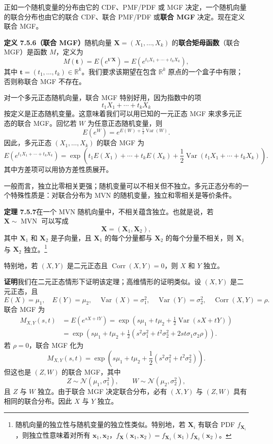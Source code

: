 \documentclass[UTF8,12pt,a4paper,fontset=fandol]{ctexart}
\begin{document}
正如一个随机变量的分布由它的 CDF、PMF/PDF 或 MGF 决定，一个随机向量的联合分布也由它的联合 CDF、联合 PMF/PDF 或\textbf{联合 MGF} 决定。现在定义联合 MGF。

\noindent\textbf{定义 7.5.6（联合 MGF）}\quad 随机向量 $\mathbf{X}=(X_1,\ldots,X_k)$ 的\textbf{联合矩母函数}（联合 MGF）是函数 $M$，定义为
\[
  M(\mathbf{t})=E(e^{\mathbf{t}'\mathbf{X}})
  =E\left(e^{t_1X_1+\cdots+t_kX_k}\right),
\]
其中 $\mathbf{t}=(t_1,\ldots,t_k)\in \mathbb{R}^k$。我们要求该期望在包含 $\mathbb{R}^k$ 原点的一个盒子中有限；否则称联合 MGF 不存在。

对一个多元正态随机向量，联合 MGF 特别好用，因为指数中的项
\[
  t_1X_1+\cdots+t_kX_k
\]
按定义是正态随机变量。这意味着我们可以用已知的一元正态 MGF 来求多元正态的联合 MGF。回忆若 $W$ 为任意正态随机变量，则
\[
  E(e^W)=e^{E(W)+\frac12\operatorname{Var}(W)}.
\]
因此，多元正态 $(X_1,\ldots,X_k)$ 的联合 MGF 为
\[
  E\left(e^{t_1X_1+\cdots+t_kX_k}\right)
  =\exp\left(t_1E(X_1)+\cdots+t_kE(X_k)
  +\frac12\operatorname{Var}(t_1X_1+\cdots+t_kX_k)\right).
\]
其中方差项可以用协方差性质展开。

一般而言，独立比零相关更强；随机变量可以不相关但不独立。多元正态分布的一个特殊性质是：对联合分布为 MVN 的随机变量，独立和零相关是等价条件。

\noindent\textbf{定理 7.5.7}\quad 在一个 MVN 随机向量中，不相关蕴含独立。也就是说，若 $\mathbf{X}\sim \operatorname{MVN}$ 可以写成
\[
  \mathbf{X}=(\mathbf{X}_1,\mathbf{X}_2),
\]
其中 $\mathbf{X}_1$ 和 $\mathbf{X}_2$ 是子向量，且 $\mathbf{X}_1$ 的每个分量都与 $\mathbf{X}_2$ 的每个分量不相关，则 $\mathbf{X}_1$ 与 $\mathbf{X}_2$ 独立。\footnote{随机向量的独立性与随机变量的独立性类似。特别地，若 $\mathbf{X}_i$ 有联合 PDF $f_{\mathbf{X}_i}$，则独立性意味着对所有 $\mathbf{x}_1,\mathbf{x}_2$，$f_{\mathbf{X}}(\mathbf{x}_1,\mathbf{x}_2)=f_{\mathbf{X}_1}(\mathbf{x}_1)f_{\mathbf{X}_2}(\mathbf{x}_2)$。}

特别地，若 $(X,Y)$ 是二元正态且 $\operatorname{Corr}(X,Y)=0$，则 $X$ 和 $Y$ 独立。

\noindent\textbf{证明}\quad 我们在二元正态情形下证明该定理；高维情形的证明类似。设 $(X,Y)$ 是二元正态，且
\[
  E(X)=\mu_1,\quad E(Y)=\mu_2,\quad
  \operatorname{Var}(X)=\sigma_1^2,\quad
  \operatorname{Var}(Y)=\sigma_2^2,\quad
  \operatorname{Corr}(X,Y)=\rho.
\]
联合 MGF 为
\[
\begin{aligned}
  M_{X,Y}(s,t)
  &=E(e^{sX+tY})
  =\exp\left(s\mu_1+t\mu_2+\frac12\operatorname{Var}(sX+tY)\right)\\
  &=\exp\left(s\mu_1+t\mu_2
  +\frac12(s^2\sigma_1^2+t^2\sigma_2^2+2st\sigma_1\sigma_2\rho)\right).
\end{aligned}
\]
若 $\rho=0$，联合 MGF 化为
\[
  M_{X,Y}(s,t)
  =\exp\left(s\mu_1+t\mu_2+\frac12(s^2\sigma_1^2+t^2\sigma_2^2)\right).
\]
但这也是 $(Z,W)$ 的联合 MGF，其中
\[
  Z\sim \mathcal{N}(\mu_1,\sigma_1^2),\qquad
  W\sim \mathcal{N}(\mu_2,\sigma_2^2),
\]
且 $Z$ 与 $W$ 独立。由于联合 MGF 决定联合分布，必有 $(X,Y)$ 与 $(Z,W)$ 具有相同的联合分布。因此 $X$ 与 $Y$ 独立。
\end{document}
